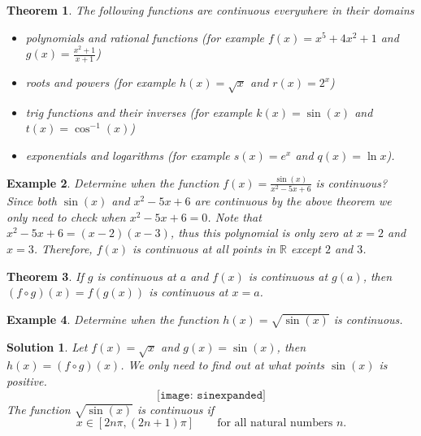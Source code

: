 \documentclass[12pt,a4paper]{book}
\newtheorem{theorem}{Theorem}[section]
\newtheorem{Example}[theorem]{Example}
\numberwithin{equation}{section}
\newtheorem*{solution}{{\bf Solution}}
\begin{document}
\begin{tcolorbox}[width=\textwidth,colback={green!20},title={},colbacktitle=yellow,coltitle=blue] 
	\begin{theorem} The following functions are continuous everywhere in their domains
		\begin{itemize}
			\item polynomials and rational functions (for example $f(x)=x^5+4x^2+1$ and $g(x)=\frac{x^2+1}{x+1}$)
			\item roots and powers (for example $h(x)=\sqrt{x}$ and $r(x)=2^x$)
						\item trig functions and their inverses (for example $k(x)=\sin(x)$ and $t(x)=\cos^{-1}(x)$)
			\item exponentials and logarithms (for example $s(x)=e^x$ and $q(x)=\ln x$). 
		\end{itemize}
	\end{theorem}
\end{tcolorbox}


\begin{tcolorbox}[width=\textwidth,colback={green!20},title={},colbacktitle=yellow,coltitle=blue] 
\begin{Example} Determine when the function $f(x)=\frac{\sin(x)}{x^2-5x+6}$ is continuous?
	Since both $\sin(x)$ and $x^2-5x+6$ are continuous by the above theorem we only need to check when $x^2-5x+6=0$. Note that $x^2-5x+6=(x-2)(x-3)$, thus this polynomial is only zero at $x=2$ and $x=3$. Therefore, $f(x)$ is continuous at all points in $\mathbb{R}$ except $2$ and $3$.
\end{Example}
\end{tcolorbox}


\begin{tcolorbox}[width=\textwidth,colback={green!20},title={},colbacktitle=yellow,coltitle=blue]
\begin{theorem}
	If $g$ is continuous at $a$ and $f(x)$ is continuous at $g(a)$, then $(f\circ g)(x)=f(g(x))$ is continuous at $x=a$. 
\end{theorem}
\end{tcolorbox}

\begin{tcolorbox}[width=\textwidth,colback={green!20},title={},colbacktitle=yellow,coltitle=blue]
\begin{Example}
	Determine when the function $h(x)=\sqrt{\sin(x)}$ is continuous. 
\end{Example}

\begin{solution}
	Let $f(x)=\sqrt{x}$ and $g(x)=\sin(x)$, then $h(x)=(f\circ g)(x)$. We only need to find out at what points $\sin(x)$ is positive.
	$$\texttt{[image: sinexpanded]}$$
	The function $\sqrt{\sin(x)}$ is continuous if 
	$$x\in [2n\pi,(2n+1)\pi]\quad \quad \text{for all natural numbers $n$}.$$
\end{solution}
\end{tcolorbox}
\end{document}
